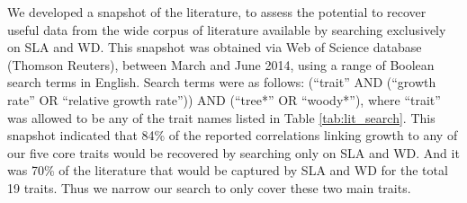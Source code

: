 

We developed a snapshot of the literature, to assess the potential to recover useful data from the wide corpus of literature available by searching exclusively on SLA and WD. This snapshot was obtained via Web of Science database (Thomson Reuters), between March and June 2014, using a range of Boolean search terms in English. Search terms were as follows: (``trait'' AND (``growth rate'' OR ``relative growth rate'')) AND (``tree*'' OR ``woody*''), where ``trait'' was allowed to be any of the trait names listed in Table \ref{tab:lit_search}. This snapshot indicated that 84\% of the reported correlations linking growth to any of our five core traits would be recovered by searching only on SLA and WD. And it was 70\% of the literature that would be captured by SLA and WD for the total 19 traits. Thus we narrow our search to only cover these two main traits.

